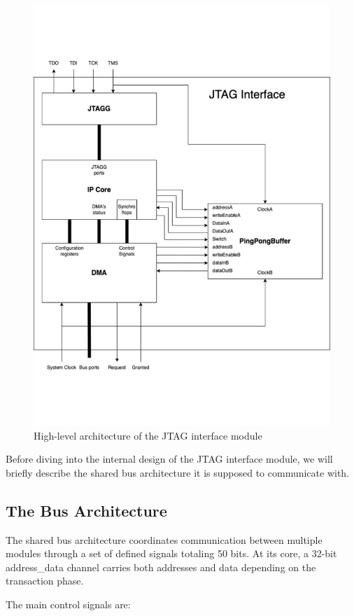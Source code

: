\documentclass[a4paper,11pt,oneside]{report}
\begin{document}
\begin{figure}
    \centering
    \includegraphics[width=0.9\linewidth]{figures/jtag_interface_overview.pdf}
    \caption{High-level architecture of the JTAG interface module}
    \label{fig:big_picture}
\end{figure}

Before diving into the internal design of the JTAG interface module, we will briefly describe the shared bus architecture it is supposed to communicate with.

\subsection{The Bus Architecture}

The shared bus architecture coordinates communication between multiple modules through a set of defined signals totaling 50 bits.
At its core, a 32-bit address\_data channel carries both addresses and data depending on the transaction phase.

The main control signals are:
\end{document}
